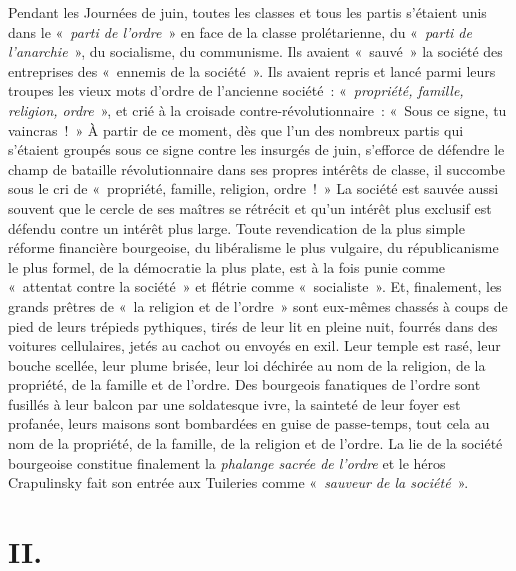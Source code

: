 \documentclass[french,twoside]{book} %
\newcommand\chapteropen{} %
\newcommand\chapterclose{} %
\begin{document}
Pendant les Journées de juin, toutes les classes et tous les partis s’étaient unis dans le « \emph{parti de l’ordre} » en face de la classe prolétarienne, du « \emph{parti de l’anarchie} », du socialisme, du communisme. Ils avaient « sauvé » la société des entreprises des « ennemis de la société ». Ils avaient repris et lancé parmi leurs troupes les vieux mots d’ordre de l’ancienne société : « \emph{propriété, famille, religion, ordre} », et crié à la croisade contre-révolutionnaire : « Sous ce signe, tu vaincras ! » À partir de ce moment, dès que l’un des nombreux partis qui s’étaient groupés sous ce signe contre les insurgés de juin, s’efforce de défendre le champ de bataille révolutionnaire dans ses propres intérêts de classe, il succombe sous le cri de « propriété, famille, religion, ordre ! » La société est sauvée aussi souvent que le cercle de ses maîtres se rétrécit et qu’un intérêt plus exclusif est défendu contre un intérêt plus large. Toute revendication de la plus simple réforme financière bourgeoise, du libéralisme le plus vulgaire, du républicanisme le plus formel, de la démocratie la plus plate, est à la fois punie comme « attentat contre la société » et flétrie comme « socialiste ». Et, finalement, les grands prêtres de « la religion et de l’ordre » sont eux-mêmes chassés à coups de pied de leurs trépieds pythiques, tirés de leur lit en pleine nuit, fourrés dans des voitures cellulaires, jetés au cachot ou envoyés en exil. Leur temple est rasé, leur bouche scellée, leur plume brisée, leur loi déchirée au nom de la religion, de la propriété, de la famille et de l’ordre. Des bourgeois fanatiques de l’ordre sont fusillés à leur balcon par une soldatesque ivre, la sainteté de leur foyer est profanée, leurs maisons sont bombardées en guise de passe-temps, tout cela au nom de la propriété, de la famille, de la religion et de l’ordre. La lie de la société bourgeoise constitue finalement la \emph{phalange sacrée de l’ordre} et le héros Crapulinsky fait son entrée aux Tuileries comme « \emph{sauveur de la société} ».
\chapterclose


\chapteropen
\chapter[{II.}]{II.}\renewcommand{\leftmark}{II.}
\end{document}
